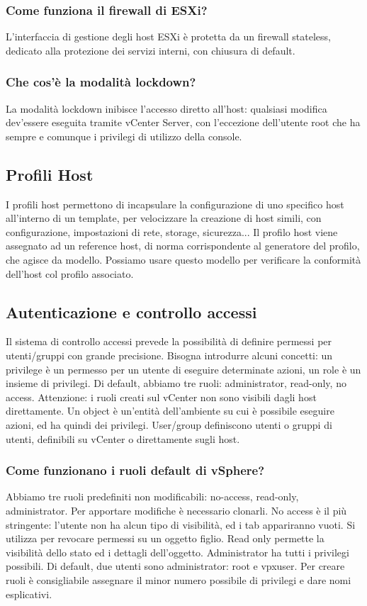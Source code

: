 \documentclass[11pt]{article}
\begin{document}
\subsubsection{Come funziona il firewall di ESXi?}
L'interfaccia di gestione degli host ESXi è protetta da un firewall stateless, dedicato alla protezione dei servizi interni, con chiusura di default. 

\subsubsection{Che cos'è la modalità lockdown?}
La modalità lockdown inibisce l'accesso diretto all'host: qualsiasi modifica dev'essere eseguita tramite vCenter Server, con l'eccezione dell'utente root che ha sempre e comunque i privilegi di utilizzo della console. 

\subsection{Profili Host}
I profili host permettono di incapsulare la configurazione di uno specifico host all'interno di un template, per velocizzare la creazione di host simili, con configurazione, impostazioni di rete, storage, sicurezza... Il profilo host viene assegnato ad un reference host, di norma corrispondente al generatore del profilo, che agisce da modello. Possiamo usare questo modello per verificare la conformità dell'host col profilo associato. 

\subsection{Autenticazione e controllo accessi}
Il sistema di controllo accessi prevede la possibilità di definire permessi per utenti/gruppi con grande precisione. Bisogna introdurre alcuni concetti: un privilege è un permesso per un utente di eseguire determinate azioni, un role è un insieme di privilegi. Di default, abbiamo tre ruoli: administrator, read-only, no access. Attenzione: i ruoli creati sul vCenter non sono visibili dagli host direttamente. Un object è un'entità dell'ambiente su cui è possibile eseguire azioni, ed ha quindi dei privilegi. User/group definiscono utenti o gruppi di utenti, definibili su vCenter o direttamente sugli host. 

\subsubsection{Come funzionano i ruoli default di vSphere?}
Abbiamo tre ruoli predefiniti non modificabili: no-access, read-only, administrator. Per apportare modifiche è necessario clonarli. No access è il più stringente: l'utente non ha alcun tipo di visibilità, ed i tab appariranno vuoti. Si utilizza per revocare permessi su un oggetto figlio. Read only permette la visibilità dello stato ed i dettagli dell'oggetto. Administrator ha tutti i privilegi possibili. Di default, due utenti sono administrator: root e vpxuser. Per creare ruoli è consigliabile assegnare il minor numero possibile di privilegi e dare nomi esplicativi. 
\end{document}

